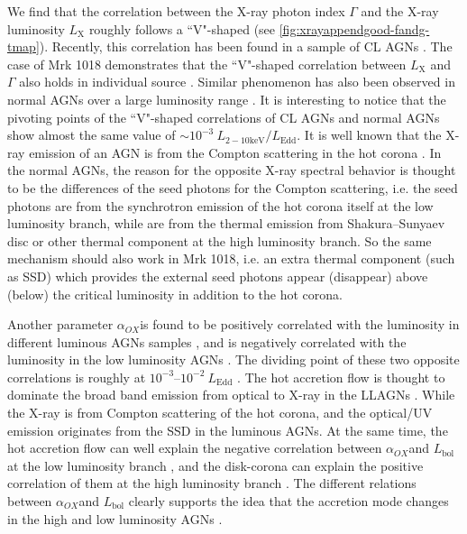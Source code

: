 \documentclass[twocolumn]{aastex63}
\newcommand{\alphaox}{$\alpha_{OX}$}
\begin{document}
We find that the correlation between the X-ray photon index $\Gamma$ and the X-ray luminosity $L_\mathrm{X}$ roughly follows a ``V"-shaped (see \autoref{fig:xrayappendgood-fandg-tmap}). Recently, this correlation has been found in a sample of CL AGNs \citep{2019arXiv191203972L}. The case of Mrk 1018 demonstrates that the ``V"-shaped correlation between $L_\mathrm{X}$ and $\Gamma$ also holds in individual source \citep[see also in ][]{2019arXiv191203972L}. Similar phenomenon has also been observed in normal AGNs over a large luminosity range  \citep[e.g. ][]{2009MNRAS.399..349G, 2011A&A...530A.149Y}. It is interesting to notice that the pivoting points of the ``V"-shaped correlations of CL AGNs and normal AGNs show almost the same value of  $\sim 10^{-3}~L_\mathrm{2-10 keV}/L_\mathrm{Edd}$. It is well known that the X-ray emission of an AGN is from the Compton scattering in the hot corona \citep[e.g.][]{1991ApJ...380L..51H}. In the normal AGNs, the reason for the opposite X-ray spectral behavior is thought to be the differences of the seed photons for the Compton scattering, i.e. the seed photons are from the synchrotron emission of the hot corona itself at the low luminosity branch, while are from the thermal emission from Shakura–Sunyaev disc \citep[SSD; e.g. ][]{2013ApJ...764....2Q} or other thermal component \citep{2015MNRAS.447.1692Y} at the high luminosity branch. So the same mechanism should also work in Mrk 1018, i.e. an extra thermal component (such as SSD) which provides the external seed photons appear (disappear) above (below) the critical luminosity in addition to the hot corona. 

Another parameter \alphaox is found to be positively correlated with the luminosity in different luminous AGNs samples \citep[e.g.][]{2010A&A...512A..34L, 2013A&A...550A..71V,2016ApJ...819..154L}, and is negatively correlated with the luminosity in the low luminosity AGNs \citep{2011ApJ...739...64X,2017MNRAS.471.2848L}. The dividing point of these two opposite correlations is roughly at $10^{-3}$--$10^{-2}~L_\mathrm{Edd}$ \citep{2011ApJ...739...64X,2017MNRAS.471.2848L}. The hot accretion flow is thought to dominate the broad band emission from optical to X-ray in the LLAGNs \citep[see reviews in ][]{2014ARA&A..52..529Y}. While the X-ray is from Compton scattering of the hot corona, and the optical/UV emission originates from the SSD in the luminous AGNs. At the same time, the hot accretion flow can well explain the negative correlation between \alphaox and $L_\mathrm{bol}$ at the low luminosity branch \citep{2011ApJ...739...64X,2017MNRAS.471.2848L}, and the disk-corona can explain the positive correlation of them at the high luminosity branch \citep{2017A&A...602A..79L, 2018MNRAS.480.1247K,2019A&A...628A.135A}. The different relations between \alphaox and $L_\mathrm{bol}$ clearly supports the idea that the accretion mode changes in the high and low luminosity AGNs \citep{2011MNRAS.413.2259S,2019ApJ...883...76R}. 
\end{document}
